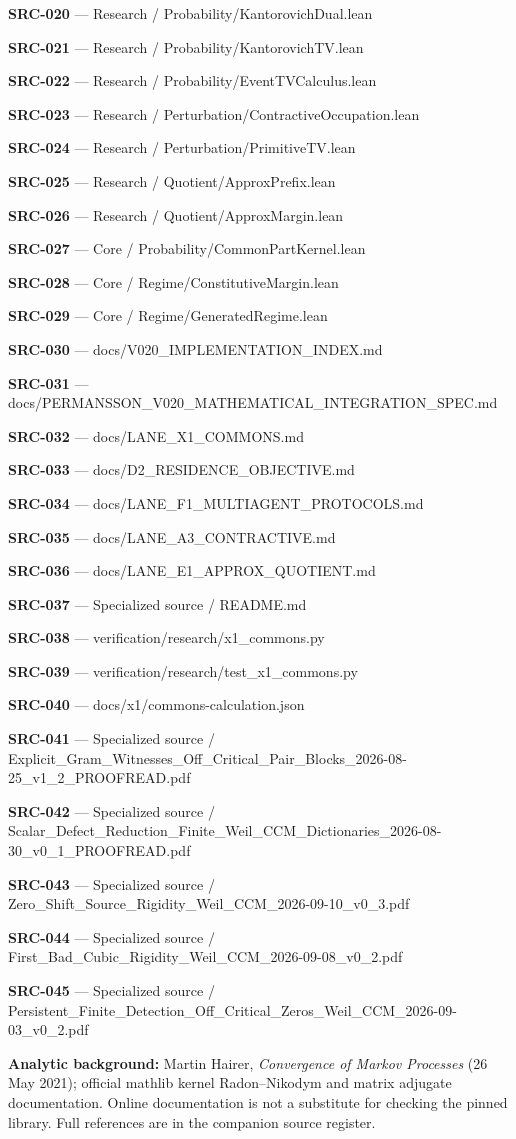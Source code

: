 \documentclass[
  11pt,
  a4paper,
]{article}
\begin{document}
\textbf{SRC-020} --- Research / Probability/KantorovichDual.lean

\textbf{SRC-021} --- Research / Probability/KantorovichTV.lean

\textbf{SRC-022} --- Research / Probability/EventTVCalculus.lean

\textbf{SRC-023} --- Research / Perturbation/ContractiveOccupation.lean

\textbf{SRC-024} --- Research / Perturbation/PrimitiveTV.lean

\textbf{SRC-025} --- Research / Quotient/ApproxPrefix.lean

\textbf{SRC-026} --- Research / Quotient/ApproxMargin.lean

\textbf{SRC-027} --- Core / Probability/CommonPartKernel.lean

\textbf{SRC-028} --- Core / Regime/ConstitutiveMargin.lean

\textbf{SRC-029} --- Core / Regime/GeneratedRegime.lean

\textbf{SRC-030} --- docs/V020\_IMPLEMENTATION\_INDEX.md

\textbf{SRC-031} ---
docs/PERMANSSON\_V020\_MATHEMATICAL\_INTEGRATION\_SPEC.md

\textbf{SRC-032} --- docs/LANE\_X1\_COMMONS.md

\textbf{SRC-033} --- docs/D2\_RESIDENCE\_OBJECTIVE.md

\textbf{SRC-034} --- docs/LANE\_F1\_MULTIAGENT\_PROTOCOLS.md

\textbf{SRC-035} --- docs/LANE\_A3\_CONTRACTIVE.md

\textbf{SRC-036} --- docs/LANE\_E1\_APPROX\_QUOTIENT.md

\textbf{SRC-037} --- Specialized source / README.md

\textbf{SRC-038} --- verification/research/x1\_commons.py

\textbf{SRC-039} --- verification/research/test\_x1\_commons.py

\textbf{SRC-040} --- docs/x1/commons-calculation.json

\textbf{SRC-041} --- Specialized source /
Explicit\_Gram\_Witnesses\_Off\_Critical\_Pair\_Blocks\_2026-08-25\_v1\_2\_PROOFREAD.pdf

\textbf{SRC-042} --- Specialized source /
Scalar\_Defect\_Reduction\_Finite\_Weil\_CCM\_Dictionaries\_2026-08-30\_v0\_1\_PROOFREAD.pdf

\textbf{SRC-043} --- Specialized source /
Zero\_Shift\_Source\_Rigidity\_Weil\_CCM\_2026-09-10\_v0\_3.pdf

\textbf{SRC-044} --- Specialized source /
First\_Bad\_Cubic\_Rigidity\_Weil\_CCM\_2026-09-08\_v0\_2.pdf

\textbf{SRC-045} --- Specialized source /
Persistent\_Finite\_Detection\_Off\_Critical\_Zeros\_Weil\_CCM\_2026-09-03\_v0\_2.pdf

\textbf{Analytic background:} Martin Hairer, \emph{Convergence of Markov
Processes} (26 May 2021); official mathlib kernel Radon--Nikodym and
matrix adjugate documentation. Online documentation is not a substitute
for checking the pinned library. Full references are in the companion
source register.
\end{document}
